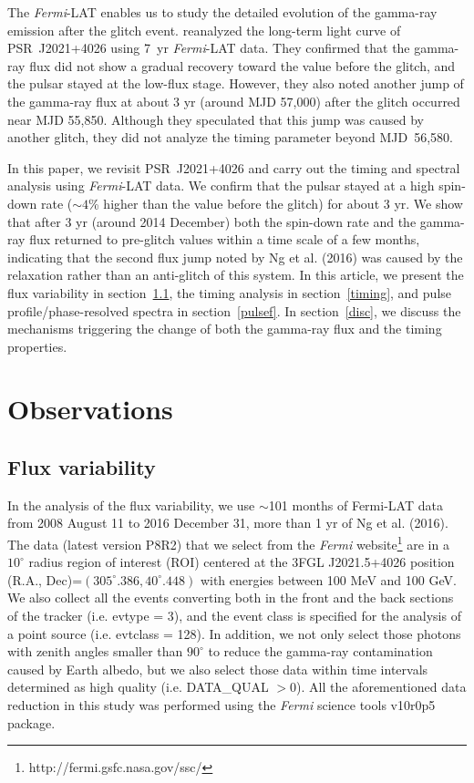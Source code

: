 \documentclass[12pt,preprint]{aastex}
\begin{document}
 The \emph{Fermi}-LAT enables us to study the detailed evolution of the gamma-ray emission after the glitch event.
 \citet{ng16} reanalyzed the long-term light curve of PSR~J2021+4026 using
 7~yr \emph{Fermi}-LAT data.
 They confirmed that the gamma-ray flux did not show a gradual recovery toward the value before the glitch, and the pulsar stayed at the low-flux stage.  However, they also noted another jump
 of the gamma-ray flux at about 3 yr (around MJD 57,000) after the
 glitch occurred near MJD 55,850.
 Although they speculated that this jump was caused by  another glitch, they
 did not analyze the timing parameter beyond MJD~56,580.

In this paper, we revisit PSR~J2021+4026 and carry out the timing and spectral analysis using \emph{Fermi}-LAT data. 
We confirm that the pulsar stayed at a high spin-down rate ($\sim 4$\% higher than the value before the glitch) for about 3 yr. 
We show that after 3 yr (around 2014 December) both the spin-down rate and the gamma-ray flux returned to pre-glitch values within a time scale of a few months, indicating that the second flux jump noted by Ng et al. (2016)
was caused by the relaxation rather than an anti-glitch of this system. 
In this article, we present the flux variability in section~\ref{fluxev}, the timing analysis in section~\ref{timing}, and pulse profile/phase-resolved spectra in section~\ref{pulsef}. 
In section~\ref{disc}, we discuss the mechanisms triggering the change of both the gamma-ray flux and the timing properties.

\section{Observations}
\subsection{Flux variability}
\label{fluxev}
In the analysis of the flux variability, we use $\sim$101 months of Fermi-LAT data from 2008 August 11 to 2016 December 31, more than 1 yr of Ng et al. (2016). 
The data (latest version P8R2) that we select from the  \emph{Fermi} website\footnote{http://fermi.gsfc.nasa.gov/ssc/} are in a $10^{\circ}$ radius region of interest (ROI) centered at the 3FGL J2021.5+4026 position (R.A., Dec)=$(305^{\circ}.386, 40^{\circ}.448)$ \citep{acero15} with energies between 100 MeV and 100 GeV.
We also collect all the events converting both in the front and the back
sections of the tracker (i.e. evtype = 3), and the event class is specified for the analysis of a point source (i.e. evtclass = 128). 
In addition, we not only select those photons with zenith angles smaller than $90^{\circ}$ to reduce the gamma-ray contamination caused by Earth albedo, but we also select those data within time intervals determined as high quality (i.e. DATA\_QUAL $>$0). 
All the aforementioned data reduction in this study was performed using the \emph{Fermi} science tools v10r0p5 package.
\end{document}
